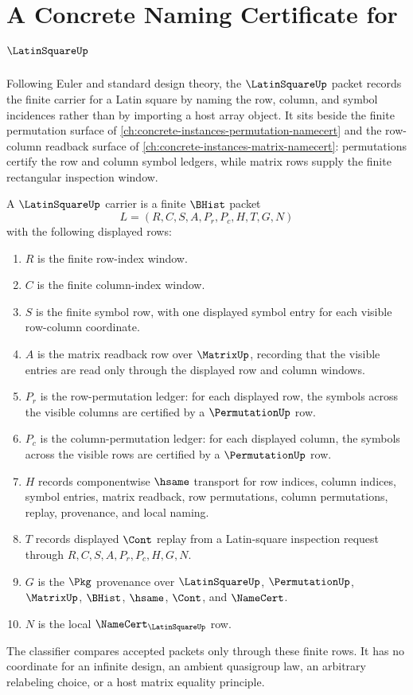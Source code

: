 \chapter{A Concrete Naming Certificate for $\LatinSquareUp$}
\label{ch:concrete-instances-latin-square-namecert}

Following Euler and standard design theory, the $\LatinSquareUp$ packet records the finite carrier for a Latin square by naming the row, column, and symbol incidences rather than by importing a host array object. It sits beside the finite permutation surface of \autoref{ch:concrete-instances-permutation-namecert} and the row-column readback surface of \autoref{ch:concrete-instances-matrix-namecert}: permutations certify the row and column symbol ledgers, while matrix rows supply the finite rectangular inspection window.

\begin{definition}
\label{def:latin-square-carrier}
A $\LatinSquareUp$ carrier is a finite $\BHist$ packet
$$
L=(R,C,S,A,P_r,P_c,H,T,G,N)
$$
with the following displayed rows:
\begin{enumerate}
  \item $R$ is the finite row-index window.
  \item $C$ is the finite column-index window.
  \item $S$ is the finite symbol row, with one displayed symbol entry for each visible row-column coordinate.
  \item $A$ is the matrix readback row over $\MatrixUp$, recording that the visible entries are read only through the displayed row and column windows.
  \item $P_r$ is the row-permutation ledger: for each displayed row, the symbols across the visible columns are certified by a $\PermutationUp$ row.
  \item $P_c$ is the column-permutation ledger: for each displayed column, the symbols across the visible rows are certified by a $\PermutationUp$ row.
  \item $H$ records componentwise $\hsame$ transport for row indices, column indices, symbol entries, matrix readback, row permutations, column permutations, replay, provenance, and local naming.
  \item $T$ records displayed $\Cont$ replay from a Latin-square inspection request through $R,C,S,A,P_r,P_c,H,G,N$.
  \item $G$ is the $\Pkg$ provenance over $\LatinSquareUp$, $\PermutationUp$, $\MatrixUp$, $\BHist$, $\hsame$, $\Cont$, and $\NameCert$.
  \item $N$ is the local $\NameCert_{\LatinSquareUp}$ row.
\end{enumerate}
The classifier compares accepted packets only through these finite rows. It has no coordinate for an infinite design, an ambient quasigroup law, an arbitrary relabeling choice, or a host matrix equality principle.
\end{definition}

